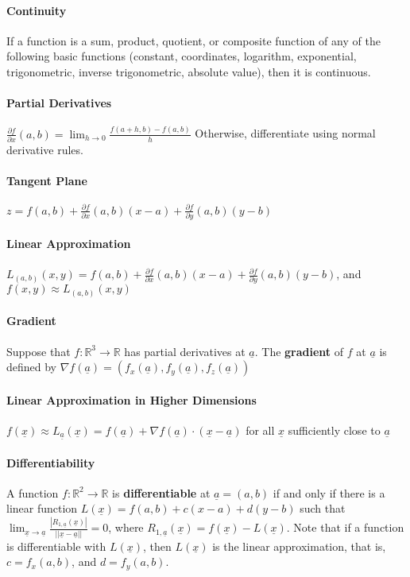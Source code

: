 \documentclass[10pt,letter]{article}
\theoremstyle{plain}
\theoremstyle{definition}
\begin{document}
\paragraph{Continuity} If a function is a sum, product, quotient, or composite function of any of the following basic functions (constant, coordinates, logarithm, exponential, trigonometric, inverse trigonometric, absolute value), then it is continuous. 
\paragraph{Partial Derivatives} $\frac{\partial f}{\partial x}(a,b)=\lim_{h\rightarrow0}\frac{f(a+h,b)-f(a,b)}{h}$ Otherwise, differentiate using normal derivative rules. 
\paragraph{Tangent Plane}$z=f(a,b)+\frac{\partial f}{\partial x}(a,b)(x-a)+\frac{\partial f}{\partial y}(a,b)(y-b)$
\paragraph{Linear Approximation} $L_{(a,b)}(x,y)=f(a,b)+\frac{\partial f}{\partial x}(a,b)(x-a)+\frac{\partial f}{\partial y}(a,b)(y-b)$, and $f(x,y)\approx L_{(a,b)}(x,y)$ 
\paragraph{Gradient} Suppose that $f:\mathbb{R}^3\rightarrow\mathbb{R}$ has partial derivatives at $\underline{a}$. The \textbf{gradient} of $f$ at $\underline{a}$ is defined by $\nabla f(\underline{a})=(f_x(\underline{a}),f_y(\underline{a}),f_z(\underline{a}))$ 
\paragraph{Linear Approximation in Higher Dimensions} $f(\underline{x})\approx L_{\underline{a}}(\underline{x})=f(\underline{a})+\nabla f(\underline{a})\cdot(\underline{x}-\underline{a})$ for all $\underline{x}$ sufficiently close to $\underline{a}$ 
\paragraph{Differentiability} A function $f:\mathbb{R}^2\rightarrow\mathbb{R}$ is \textbf{differentiable} at $\underline{a}=(a,b)$ if and only if there is a linear function $L(\underline{x})=f(a,b)+c(x-a)+d(y-b)$ such that $\lim_{\underline{x}\rightarrow\underline{a}}\frac{|R_{1,\underline{a}}(\underline{x})|}{||\underline{x}-\underline{a}||}=0$, where $R_{1,\underline{a}}(\underline{x})=f(\underline{x})-L(\underline{x})$. Note that if a function is differentiable with $L(\underline{x})$, then $L(\underline{x})$ is the linear approximation, that is, $c=f_x(a,b)$, and $d=f_y(a,b)$. 
\end{document}
